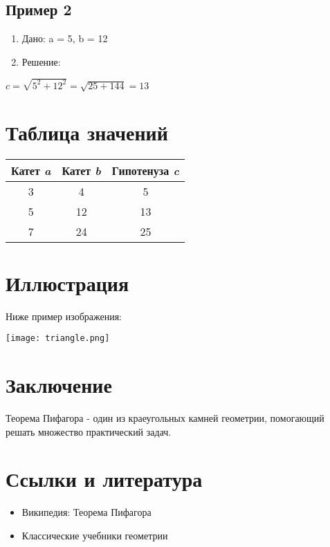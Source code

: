 \documentclass{article}
\begin{document}
\subsection*{Пример 2}
\begin{enumerate}
    \item Дано: a = 5, b = 12
    \item Решение:
    \\
\end{enumerate}
\begin{center}
    $c=\sqrt{5^2+12^2}=\sqrt{25+144}=13$
\end{center}

\section{Таблица значений}
\begin{center}
\begin{tabular}{|c|c|c|}
\hline
Катет \textit{a}&Катет \textit{b}&Гипотенуза \textit{c}\\
\hline
3&4&5\\
\hline
5&12&13\\
\hline
7&24&25\\
\hline
\end{tabular}
\end{center}
\section{Иллюстрация}
Ниже пример изображения:
\begin{center}
    \texttt{[image: triangle.png]}
\end{center}

\section{Заключение}
Теорема Пифагора - один из краеугольных камней геометрии, помогающий решать множество практический задач.

\section{Ссылки и литература}
\begin{itemize}
    \item Википедия: Теорема Пифагора
    \item Классические учебники геометрии
\end{itemize}
\end{document}
